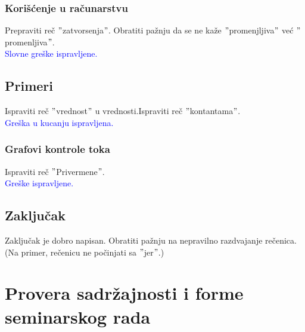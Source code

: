\documentclass[a4paper]{report}
\newcommand{\odgovor}[1]{\textcolor{blue}{#1}}
\begin{document}
\subsubsection{Korišćenje u računarstvu}
Prepraviti reč $"$zatvorsenja$"$. Obratiti pažnju da se ne kaže $"$promenjljiva$"$ već $"$promenljiva$"$. \\
\odgovor{Slovne greške ispravljene.}

\subsection{Primeri}
Ispraviti reč $"$vrednost$"$ u vrednosti.Ispraviti reč $"$kontantama$"$. 
\\
\odgovor{Greška u kucanju ispravljena.}
\subsubsection{Grafovi kontrole toka}
Ispraviti reč $"$Privermene$"$.
\\
\odgovor{Greške ispravljene.}

\subsection{Zaključak}
Zaključak je dobro napisan. Obratiti pažnju na nepravilno razdvajanje rečenica. (Na primer, rečenicu ne počinjati sa $"$jer$"$.)
\section{Provera sadržajnosti i forme seminarskog rada}
\end{document}
